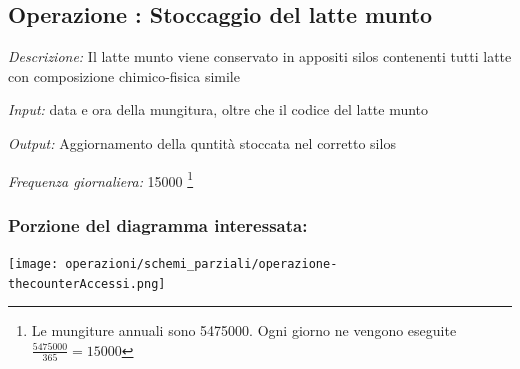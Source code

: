 \documentclass[12pt,a4paper]{article}
\begin{document}
\subsection*{Operazione \thecounterAccessi{}: Stoccaggio del latte munto}
\noindent\textit{Descrizione:} Il latte munto viene conservato in appositi silos contenenti tutti latte con composizione chimico-fisica simile

\noindent\textit{Input:} data e ora della mungitura, oltre che il codice del latte munto

\noindent\textit{Output:} Aggiornamento della quntità stoccata nel corretto silos

\noindent\textit{Frequenza giornaliera:} 15000 \footnote{Le mungiture annuali sono 5475000. Ogni giorno ne vengono eseguite $\frac{5475000}{365}=15000$}

\subsubsection*{Porzione del diagramma interessata:}

\texttt{[image: operazioni/schemi\_parziali/operazione-\\thecounterAccessi.png]} 
\end{document}

